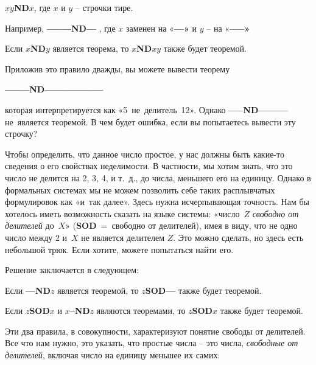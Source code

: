 \documentclass[../main.tex]{subfiles}
\begin{document}
\begin{tcolorbox}[title={СХЕМА АКСИОМ}]
    \textbf{$xy$ND$x$}, где $x$ и $y$ \--- строчки тире.
\end{tcolorbox}

Например, \textbf{--{}--{}--{}--{}--ND--{}--} , где $x$ заменен на «\textbf{--{}--»} и $y$ \--- на «\textbf{--{}--{}--»}

\begin{tcolorbox}[title={ПРАВИЛО}]
    Если \textbf{$x$ND$y$} является теорема, то \textbf{$x$ND$xy$} также будет теоремой.
\end{tcolorbox}

Приложив это правило дважды, вы можете вывести теорему
%
\begin{center}
    \textbf{--{}--{}--{}--{}--ND--{}--{}--{}--{}--{}--{}--{}--{}--{}--{}--{}--}
\end{center}
%
которая интерпретируется как «5~не~делитель~12».
Однако \textbf{--{}--{}--ND--{}--{}--{}--{}--{}--} не~является теоремой.
В чем будет ошибка, если вы попытаетесь вывести эту строчку?

Чтобы определить, что данное число простое, у нас должны быть какие-то сведения о его свойствах неделимости.
В частности, мы хотим знать, что это число не делится на 2, 3, 4, и т.~д., до числа, меньшего его на единицу.
Однако в формальных системах мы не можем позволить себе таких расплывчатых формулировок как «и~так далее».
Здесь нужна исчерпывающая точность.
Нам бы хотелось иметь возможность сказать на языке системы: «число~$Z$ \emph{свободно от делителей} до~$X$» (\textbf{SOD}~=~свободно от делителей), имея в виду, что не одно число между 2 и~$X$ не является делителем $Z$.
Это можно сделать, но здесь есть небольшой трюк.
Если хотите, можете попытаться найти его.

Решение заключается в следующем:

\begin{tcolorbox}[title={ПРАВИЛО 1}]
    Если \textbf{--{}--ND$z$} является теоремой, то \textbf{$z$SOD--{}--} также будет теоремой.
\end{tcolorbox}

\begin{tcolorbox}[title={ПРАВИЛО 2}]
    Если \textbf{$z$SOD$x$} и \textbf{$x$--ND$z$} являются теоремами, то \textbf{$z$SOD$x$} также будет теоремой.
\end{tcolorbox}

Эти два правила, в совокупности, характеризуют понятие свободы от делителей.
Все что нам нужно, это указать, что простые числа \--- это числа, \emph{свободные от делителей}, включая число на единицу меньшее их самих:
\end{document}
